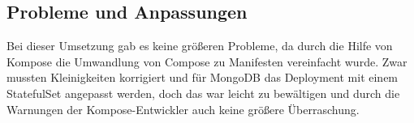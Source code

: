 \subsection{Probleme und Anpassungen}

Bei dieser Umsetzung gab es keine größeren Probleme, da durch die Hilfe von Kompose die Umwandlung von Compose zu Manifesten vereinfacht wurde. Zwar mussten Kleinigkeiten korrigiert und für MongoDB das Deployment mit einem StatefulSet angepasst werden, doch das war leicht zu bewältigen und durch die Warnungen der Kompose-Entwickler auch keine größere Überraschung.